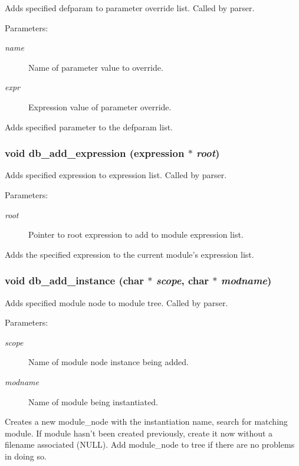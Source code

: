 Adds specified defparam to parameter override list. Called by parser.

\begin{Desc}
\item[Parameters: ]\par
\begin{description}
\item[{\em 
name}]Name of parameter value to override. \item[{\em 
expr}]Expression value of parameter override.\end{description}
\end{Desc}
Adds specified parameter to the defparam list. 
\subsubsection{\setlength{\rightskip}{0pt plus 5cm}void db\_\-add\_\-expression ({\bf expression} $\ast$ {\em root})}\label{db_8h_a9}


Adds specified expression to expression list. Called by parser.

\begin{Desc}
\item[Parameters: ]\par
\begin{description}
\item[{\em 
root}]Pointer to root expression to add to module expression list.\end{description}
\end{Desc}
Adds the specified expression to the current module's expression list. 
\subsubsection{\setlength{\rightskip}{0pt plus 5cm}void db\_\-add\_\-instance (char $\ast$ {\em scope}, char $\ast$ {\em modname})}\label{db_8h_a2}


Adds specified module node to module tree. Called by parser.

\begin{Desc}
\item[Parameters: ]\par
\begin{description}
\item[{\em 
scope}]Name of module node instance being added. \item[{\em 
modname}]Name of module being instantiated.\end{description}
\end{Desc}
Creates a new module\_\-node with the instantiation name, search for matching module. If module hasn't been created previously, create it now without a filename associated (NULL). Add module\_\-node to tree if there are no problems in doing so. 
